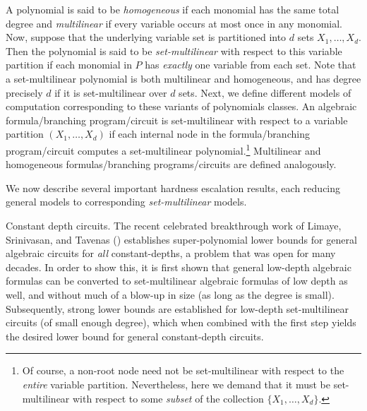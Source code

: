 \documentclass{article}
\begin{document}
A polynomial is said to be \emph{homogeneous}
if each monomial has the same total degree and \emph{multilinear} if every variable occurs
at most once in any monomial. Now, suppose that the underlying variable set is partitioned into $d$ sets
$X_1,\ldots, X_d$. Then the polynomial is said to be \emph{set-multilinear} with respect to this variable partition if each
monomial in $P$ has \emph{exactly} one variable from each set. Note that a set-multilinear polynomial is both multilinear and homogeneous, and has degree precisely $d$ if it is set-multilinear over $d$ sets. Next, we define different models
of computation corresponding to these variants of polynomials classes. An algebraic formula/branching program/circuit is set-multilinear with respect to a variable partition
$(X_1,\ldots, X_d)$ if each internal node in the formula/branching program/circuit computes a set-multilinear polynomial.\footnote{Of course, a non-root node need not be set-multilinear with respect to the \emph{entire} variable partition. Nevertheless, here we demand that it must be set-multilinear with respect to some \emph{subset} of the collection $\{X_1,\ldots,X_d\}$.} Multilinear and homogeneous formulas/branching programs/circuits are defined analogously.  

We now describe several important hardness escalation results, each reducing general models to corresponding \emph{set-multilinear} models.

\begin{paragraph}{Constant depth circuits.}
    The recent celebrated breakthrough work of Limaye, Srinivasan, and Tavenas (\cite{LST1}) establishes super-polynomial lower bounds for general algebraic circuits for \emph{all} constant-depths, a problem that was open for many decades. In order to show this, it is first shown that general low-depth algebraic formulas can be converted to set-multilinear algebraic formulas of low depth as well, and without much of a blow-up in size (as long as the degree is small). Subsequently, strong lower bounds are established for low-depth set-multilinear circuits (of small enough degree), which when combined with the first step yields the desired lower bound for general constant-depth circuits.
\end{paragraph}
\end{document}
